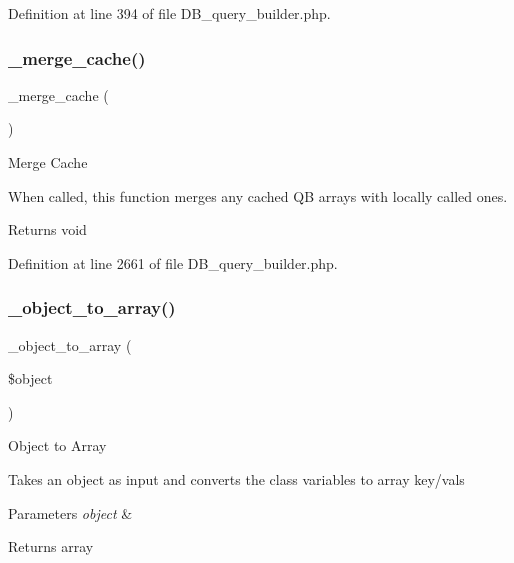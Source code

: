 Definition at line 394 of file D\+B\+\_\+query\+\_\+builder.\+php.

\mbox{\label{class_c_i___d_b__query__builder_aeee4c0cf664e1a65d7eb8a3c8e9970c6}} 
\subsubsection{\texorpdfstring{\_merge\_cache()}{\_merge\_cache()}}
{\footnotesize\ttfamily \+\_\+merge\+\_\+cache (\begin{DoxyParamCaption}{ }\end{DoxyParamCaption})\hspace{0.3cm}{\ttfamily [protected]}}

Merge Cache

When called, this function merges any cached QB arrays with locally called ones.

\begin{DoxyReturn}{Returns}
void 
\end{DoxyReturn}


Definition at line 2661 of file D\+B\+\_\+query\+\_\+builder.\+php.

\mbox{\label{class_c_i___d_b__query__builder_a50b3069661bbf4605b6b561f38eae849}} 
\subsubsection{\texorpdfstring{\_object\_to\_array()}{\_object\_to\_array()}}
{\footnotesize\ttfamily \+\_\+object\+\_\+to\+\_\+array (\begin{DoxyParamCaption}\item[{}]{\$object }\end{DoxyParamCaption})\hspace{0.3cm}{\ttfamily [protected]}}

Object to Array

Takes an object as input and converts the class variables to array key/vals


\begin{DoxyParams}{Parameters}
{\em object} & \\
\hline
\end{DoxyParams}
\begin{DoxyReturn}{Returns}
array 
\end{DoxyReturn}


